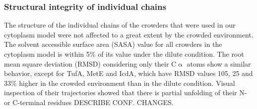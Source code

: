 \documentclass[journal=jacsat,manuscript=article]{achemso}
\begin{document}
\subsubsection{Structural integrity of individual chains}
The structure of the individual chains of the crowders that were used in our cytoplasm model were not affected to a great extent by the crowded environment. The solvent accessible surface area (SASA) value for all crowders in the cytoplasm model is within 5\% of its value under the dilute condition. The root mean square deviation (RMSD) considering only their C$\upalpha$ atoms show a similar behavior, except for TufA, MetE and IcdA, which have RMSD values 105, 25 and 33\% higher in the crowded environment than in the dilute condition. Visual inspection of their trajectories showed that there is partial unfolding of their N- or C-terminal residues \colorbox{red!50}{DESCRIBE CONF. CHANGES}.
\end{document}
